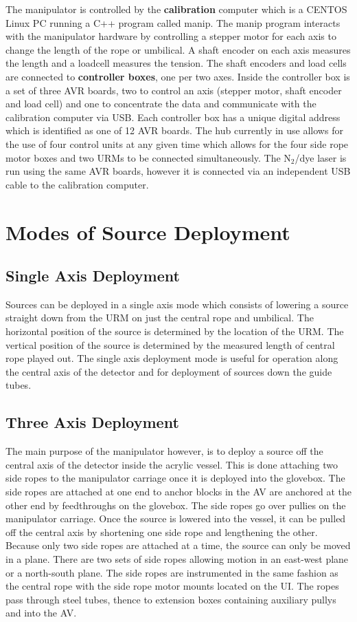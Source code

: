 The manipulator is controlled by the \textbf{calibration} computer
which is a CENTOS Linux PC running a C++ program called manip. The
manip program interacts with the manipulator hardware by controlling a
stepper motor for each axis to change the length of the rope or
umbilical. A shaft encoder on each axis measures the length and a
loadcell measures the tension. The shaft encoders and load cells are
connected to \textbf{controller boxes}, one per two axes. Inside the
controller box is a set of three AVR boards, two to control an axis
(stepper motor, shaft encoder and load cell) and one to concentrate
the data and communicate with the calibration computer via USB. Each
controller box has a unique digital address which is identified as one
of 12 AVR boards. The hub currently in use allows for the use of four
control units at any given time which allows for the four side rope
motor boxes and two URMs to be connected simultaneously. The
N$_{2}$/dye laser is run using the same AVR boards, however it is
connected via an independent USB cable to the calibration computer.

\section{Modes of Source Deployment}

\subsection{Single Axis Deployment}

Sources can be deployed in a single axis mode which consists of
lowering a source straight down from the URM on just the central rope
and umbilical. The horizontal position of the source is determined by
the location of the URM. The vertical position of the source is
determined by the measured length of central rope played out. The
single axis deployment mode is useful for operation along the central
axis of the detector and for deployment of sources down the guide
tubes.

\subsection{Three Axis Deployment}

The main purpose of the manipulator however, is to deploy a source off
the central axis of the detector inside the acrylic vessel. This is
done attaching two side ropes to the manipulator carriage once it is
deployed into the glovebox. The side ropes are attached at one end to
anchor blocks in the AV are anchored at the other end by feedthroughs
on the glovebox. The side ropes go over pullies on the manipulator
carriage. Once the source is lowered into the vessel, it can be pulled
off the central axis by shortening one side rope and lengthening the
other. Because only two side ropes are attached at a time, the source
can only be moved in a plane. There are two sets of side ropes
allowing motion in an east-west plane or a north-south plane. The side
ropes are instrumented in the same fashion as the central rope with
the side rope motor mounts located on the UI. The ropes pass through
steel tubes, thence to extension boxes containing auxiliary pullys and
into the AV. 

